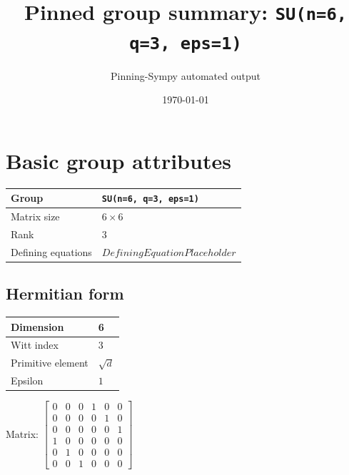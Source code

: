 \documentclass[11pt]{article}
\title{Pinned group summary: \texttt{SU(n=6, q=3, eps=1)}}
\author{Pinning-Sympy automated output}
\date{\today}
\theoremstyle{definition}
\begin{document}
\maketitle
\tableofcontents

\newpage

\section{Basic group attributes}

\begin{tabular}{|l|l|}
	\hline
    Group & \texttt{SU(n=6, q=3, eps=1)} \\
	\hline
    Matrix size & $6 \times 6$ \\
	\hline
    Rank & $3$ \\
	\hline
	Defining equations & $DefiningEquationPlaceholder$ \\
	\hline
\end{tabular}

\subsection{Hermitian form}
\begin{tabular}{|l|l|}
    \hline
    Dimension & 6 \\
    \hline
    Witt index & 3 \\
    \hline
    Primitive element & $\sqrt{d}$ \\
    \hline
    Epsilon & $1$ \\
    \hline
\end{tabular}

\bigskip
\noindent Matrix: \(
\left[\begin{matrix}0 & 0 & 0 & 1 & 0 & 0\\0 & 0 & 0 & 0 & 1 & 0\\0 & 0 & 0 & 0 & 0 & 1\\1 & 0 & 0 & 0 & 0 & 0\\0 & 1 & 0 & 0 & 0 & 0\\0 & 0 & 1 & 0 & 0 & 0\end{matrix}\right]
\)
\end{document}
